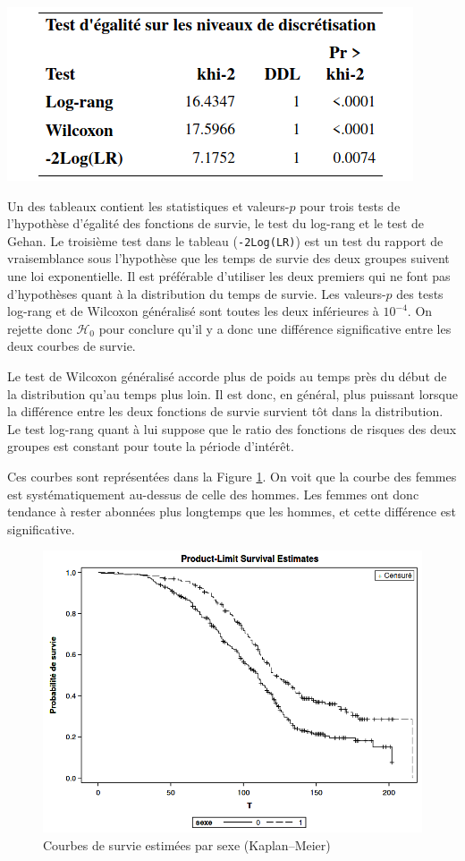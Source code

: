 \documentclass[
  11pt,
  letterpaper,
]{book}
\theoremstyle{definition}
\theoremstyle{definition}
\theoremstyle{definition}
\theoremstyle{remark}
\begin{document}
\begin{center}\includegraphics[width=0.55\linewidth]{figures/05-survie-e9} \end{center}

Un des tableaux contient les statistiques et valeurs-\(p\) pour trois tests de l'hypothèse d'égalité des fonctions de survie, le test du log-rang et le test de Gehan. Le troisième test dans le tableau (\texttt{-2Log(LR)}) est un test du rapport de vraisemblance sous l'hypothèse que les temps de survie des deux groupes suivent une loi exponentielle. Il est préférable d'utiliser les deux premiers qui ne font pas d'hypothèses quant à la distribution du temps de survie. Les valeurs-\(p\) des tests log-rang et de Wilcoxon généralisé sont toutes les deux inférieures à \(10^{-4}\). On rejette donc \(\mathcal{H}_0\) pour conclure qu'il y a donc une différence significative entre les deux courbes de survie.

Le test de Wilcoxon généralisé accorde plus de poids au temps près du début de la distribution qu'au temps plus loin. Il est donc, en général, plus puissant lorsque la différence entre les deux fonctions de survie survient tôt dans la distribution. Le test log-rang quant à lui suppose que le ratio des fonctions de risques des deux groupes est constant pour toute la période d'intérêt.

Ces courbes sont représentées dans la Figure \ref{fig:fig5-e10}. On voit que la courbe des femmes est systématiquement au-dessus de celle des hommes. Les femmes ont donc tendance à rester abonnées plus longtemps que les hommes, et cette différence est significative.

\begin{figure}

{\centering \includegraphics[width=0.83\linewidth]{figures/05-survie-e10} 

}

\caption{Courbes de survie estimées par sexe (Kaplan--Meier)}\label{fig:fig5-e10}
\end{figure}
\end{document}

